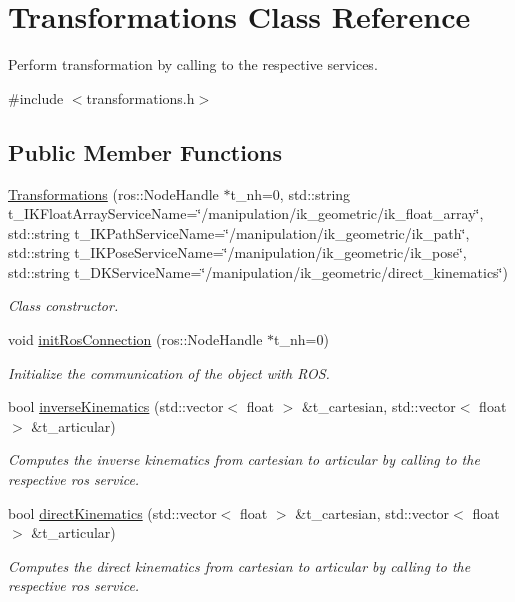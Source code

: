 \hypertarget{class_transformations}{}\section{Transformations Class Reference}
\label{class_transformations}


Perform transformation by calling to the respective services.  




{\ttfamily \#include $<$transformations.\+h$>$}

\subsection*{Public Member Functions}
\begin{DoxyCompactItemize}
\item 
\hyperlink{class_transformations_a2fccde11f2e479e084d1126ff6a3449e}{Transformations} (ros\+::\+Node\+Handle $\ast$t\+\_\+nh=0, std\+::string t\+\_\+\+I\+K\+Float\+Array\+Service\+Name=\char`\"{}/manipulation/ik\+\_\+geometric/ik\+\_\+float\+\_\+array\char`\"{}, std\+::string t\+\_\+\+I\+K\+Path\+Service\+Name=\char`\"{}/manipulation/ik\+\_\+geometric/ik\+\_\+path\char`\"{}, std\+::string t\+\_\+\+I\+K\+Pose\+Service\+Name=\char`\"{}/manipulation/ik\+\_\+geometric/ik\+\_\+pose\char`\"{}, std\+::string t\+\_\+\+D\+K\+Service\+Name=\char`\"{}/manipulation/ik\+\_\+geometric/direct\+\_\+kinematics\char`\"{})
\begin{DoxyCompactList}\small\item\em Class constructor. \end{DoxyCompactList}\item 
void \hyperlink{class_transformations_ab44a30803198e678110ea6751aff3303}{init\+Ros\+Connection} (ros\+::\+Node\+Handle $\ast$t\+\_\+nh=0)
\begin{DoxyCompactList}\small\item\em Initialize the communication of the object with R\+OS. \end{DoxyCompactList}\item 
bool \hyperlink{class_transformations_a0ea6bf169b46c81489954a6d86dc68f0}{inverse\+Kinematics} (std\+::vector$<$ float $>$ \&t\+\_\+cartesian, std\+::vector$<$ float $>$ \&t\+\_\+articular)
\begin{DoxyCompactList}\small\item\em Computes the inverse kinematics from cartesian to articular by calling to the respective ros service. \end{DoxyCompactList}\item 
bool \hyperlink{class_transformations_a1d1962699b67b369ea252172ade6fffe}{direct\+Kinematics} (std\+::vector$<$ float $>$ \&t\+\_\+cartesian, std\+::vector$<$ float $>$ \&t\+\_\+articular)
\begin{DoxyCompactList}\small\item\em Computes the direct kinematics from cartesian to articular by calling to the respective ros service. \end{DoxyCompactList}\end{DoxyCompactItemize}


